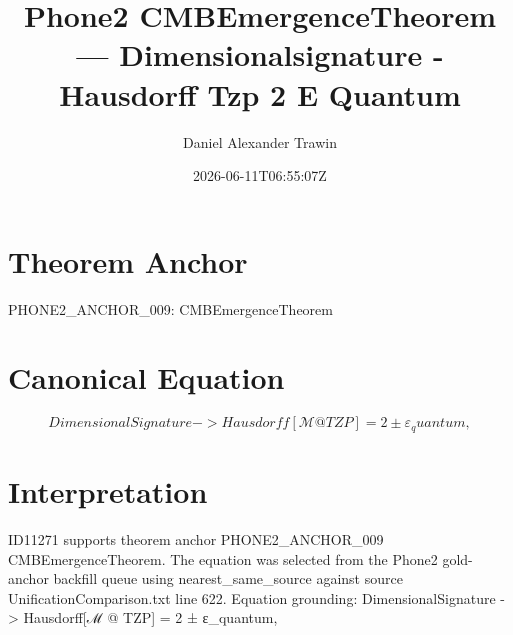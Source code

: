 \documentclass[11pt]{article}
\title{Phone2 CMBEmergenceTheorem — Dimensionalsignature - Hausdorff Tzp 2 Ε Quantum}
\author{Daniel Alexander Trawin}
\date{2026-06-11T06:55:07Z}
\begin{document}
\maketitle
\section*{Theorem Anchor}
PHONE2_ANCHOR_009: CMBEmergenceTheorem
\section*{Canonical Equation}
\[
DimensionalSignature -> Hausdorff[ℳ @ TZP] = 2 ± ε_quantum,
\]
\section*{Interpretation}
ID11271 supports theorem anchor PHONE2_ANCHOR_009 CMBEmergenceTheorem. The equation was selected from the Phone2 gold-anchor backfill queue using nearest_same_source against source UnificationComparison.txt line 622. Equation grounding: DimensionalSignature -> Hausdorff[ℳ @ TZP] = 2 ± ε_quantum,
\end{document}
